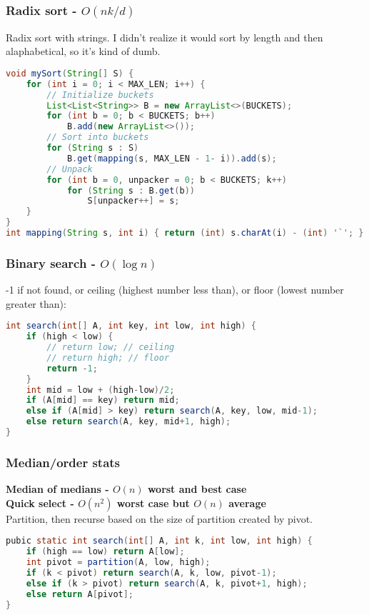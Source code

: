 \documentclass[10pt]{article}
\begin{document}
\subsubsection{Radix sort - $O(nk/d)$}
Radix sort with strings. I didn't realize it would sort by length and then alaphabetical, so it's kind of dumb.
\begin{lstlisting}[language=java]
void mySort(String[] S) {                                  
    for (int i = 0; i < MAX_LEN; i++) {                                    
        // Initialize buckets                                                
        List<List<String>> B = new ArrayList<>(BUCKETS);                  
        for (int b = 0; b < BUCKETS; b++)
            B.add(new ArrayList<>());                                       
        // Sort into buckets                                       
        for (String s : S)                                           
            B.get(mapping(s, MAX_LEN - 1- i)).add(s);
        // Unpack
        for (int b = 0, unpacker = 0; b < BUCKETS; k++)                             
            for (String s : B.get(b))
                S[unpacker++] = s;                           
    }
}
int mapping(String s, int i) { return (int) s.charAt(i) - (int) '`'; }
\end{lstlisting}

\subsubsection{Binary search - $O(\log n)$}
-1 if not found, or ceiling (highest number less than), or floor (lowest number greater than):
\begin{lstlisting}[language=java]
int search(int[] A, int key, int low, int high) {
    if (high < low) {
        // return low; // ceiling
        // return high; // floor
        return -1;
    }
    int mid = low + (high-low)/2;
    if (A[mid] == key) return mid;
    else if (A[mid] > key) return search(A, key, low, mid-1);
    else return search(A, key, mid+1, high);
}
\end{lstlisting}

\subsubsection{Median/order stats}
\textbf{Median of medians - $O(n)$ worst and best case}\\
\textbf{Quick select - $O(n^2)$ worst case but $O(n)$ average}\\
Partition, then recurse based on the size of partition created by pivot.
\begin{lstlisting}[language=java]
pubic static int search(int[] A, int k, int low, int high) {
    if (high == low) return A[low];
    int pivot = partition(A, low, high);
    if (k < pivot) return search(A, k, low, pivot-1);
    else if (k > pivot) return search(A, k, pivot+1, high);
    else return A[pivot];
}
\end{lstlisting}
\end{document}
